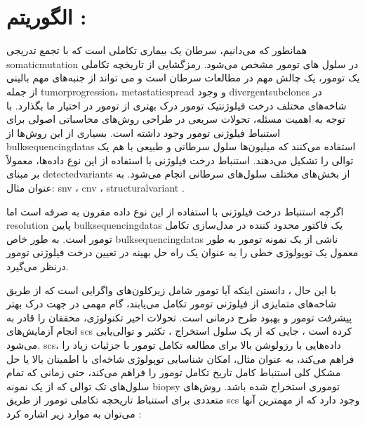 \section{الگوریتم : \cite{azer2020tumor}}

همانطور که می‌دانیم، سرطان یک بیماری تکاملی است که با تجمع تدریجی \gls{somaticmutation} در سلول های تومور مشخص می‌شود. رمزگشایی از تاریخچه تکاملی یک تومور، یک چالش مهم در مطالعات سرطان است و می تواند از جنبه‌های مهم بالینی از جمله \gls{tumorprogression}،  \gls{metastaticspread} و وجود \gls{divergentsubclones} در شاخه‌های مختلف درخت فیلوژنتیک تومور درک بهتری از تومور در اختیار ما بگذارد. با توجه به اهمیت مسئله، تحولات سریعی در طراحی روش‌های محاسباتی اصولی برای استنباط فیلوژنی تومور وجود داشته است.  بسیاری از این روش‌ها از \glspl{bulksequencingdata} استفاده می‌کنند که  میلیون‌ها سلول سرطانی و طبیعی با هم یک توالی را تشکیل می‌دهند. استنباط درخت فیلوژنی با استفاده از این نوع داده‌ها، معمولاً بر مبنای \gls{detectedvariants} از بخش‌های مختلف سلول‌های سرطانی انجام می‌شود. به عنوان مثال:
 \gls{snv} \cite{strino2013trap, el2015reconstruction, malikic2020studying, donmez2016clonality, satas2017tumor, husic2019mipup}،  \gls{cnv} \cite{zaccaria2017copy}، \gls{structuralvariant} \cite{eaton2018deconvolution, ricketts2020meltos}.
 
 اگرچه استنباط درخت فیلوژنی با استفاده از این نوع داده مقرون به صرفه است اما \gls{resolution} پایین \glspl{bulksequencingdata} یک فاکتور محدود کننده در مدل‌سازی تکامل تومور است. به طور خاص \glspl{bulksequencingdata} ناشی از یک نمونه تومور به طور معمول یک توپولوژی خطی را به عنوان یک راه حل بهینه در تعیین درخت فیلوژنی تومور درنظر می‌گیرد. \cite{donmez2016clonality}
 
 
 
 
 با این حال ، دانستن اینکه آیا تومور شامل زیرکلون‌های واگرایی است که از طریق شاخه‌های متمایزی از فیلوژنی تومور تکامل می‌یابند، گام مهمی در جهت درک بهتر پیشرفت تومور و بهبود طرح درمانی است. تحولات اخیر تکنولوژی، محققان را قادر به انجام آزمایش‌های \gls{scs} کرده است ، جایی که  از یک سلول استخراج ، تکثیر و توالی‌یابی می‌شود. \gls{scs}، داده‌هایی با رزولوشن بالا برای مطالعه تکامل تومور با جزئیات زیاد را فراهم می‌کند، به عنوان مثال، امکان شناسایی توپولوژی شاخه‌ای با اطمینان بالا یا حل مشکل کلی استنباط کامل تاریخ تکامل تومور را فراهم می‌کند، حتی زمانی که تمام سلول‌های تک توالی که از یک نمونه \gls{biopsy} توموری استخراج شده باشد. روش‌های متعددی برای استنباط تاریحچه تکاملی تومور  از طریق  \gls{scs} وجود دارد که از مهمترین آنها می‌توان به موارد زیر اشاره کرد :  
 
